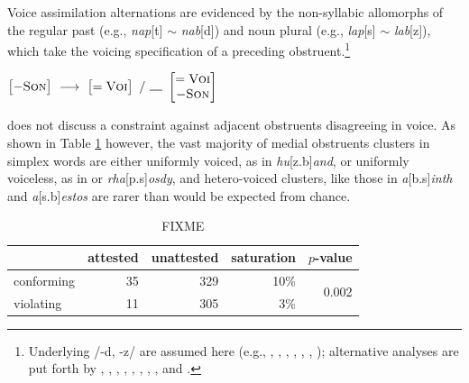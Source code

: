 Voice assimilation alternations are evidenced by the non-syllabic allomorphs of the regular past (e.g., \emph{nap}[t] $\sim$ \emph{nab}[d]) and noun plural (e.g., \emph{lap}[s] $\sim$ \emph{lab}[z]), which take the voicing specification of a preceding obstruent.\footnote{Underlying /-d, -z/ are assumed here (e.g., \citealt{Anderson1973a}, \citealt[284f.]{Bakovic2005b}, \citealt{Basboll1972}, \citealt[210]{SPE}, \citealt[282]{Hockett1958}, \citealt[102]{Pinker1988}, \citealt{Shibatani1972}); alternative analyses are put forth by \citet[210f.]{LANGUAGE}, \citet[135]{Borowsky1986}, \citet{Hoard1971}, \citet{Kiparsky1985}, \citet{Lightner1970}, \citet{Luelsdorff1969}, \citet{Miner1975}, \citet[426]{Nida1948}, and \citet{Zwicky1975}.}

\begin{example}
\label{ovarule}
$\begin{bmatrix} -\textsc{Son} \end{bmatrix}~\goesto~\begin{bmatrix} =\textsc{Voi} \end{bmatrix}~/~\gap~\begin{bmatrix} =\textsc{Voi} \\ -\textsc{Son} \end{bmatrix}$
\end{example}

\noindent
\citet{Pierrehumbert1994} does not discuss a constraint against adjacent obstruents disagreeing in voice. As shown in Table \ref{ovatab} however, the vast majority of medial obstruents clusters in simplex words are either uniformly voiced, as in \emph{hu}[z.b]\emph{and}, or uniformly voiceless, as in or \emph{rha}[p.s]\emph{osdy}, and hetero-voiced clusters, like those in \emph{a}[b.s]\emph{inth} and \emph{a}[s.b]\emph{estos} are rarer than would be expected from chance.

\begin{table}
\centering
\begin{tabular}{l rrrr}
\toprule
           & attested & unattested & saturation & $p$-value \\
\midrule
conforming & 35       & 329        & 10\%       & \multirow{2}{*}{0.002} \\
violating  & 11       & 305        &  3\%       \\
\bottomrule
\end{tabular}
\caption{FIXME}
\label{ovatab}
\end{table}

